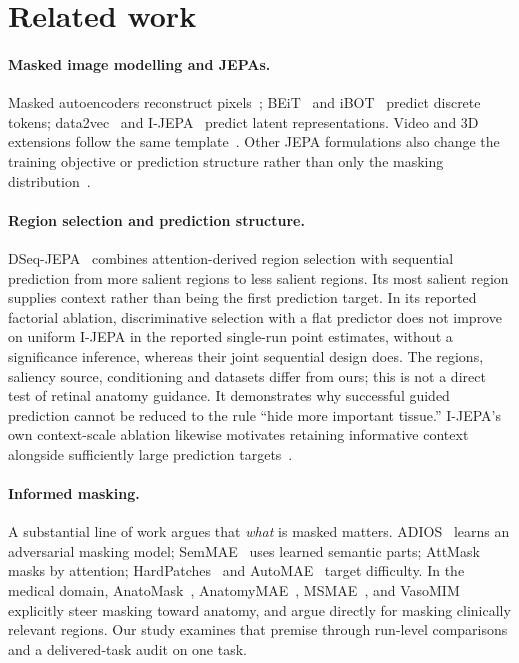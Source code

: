 \documentclass{article}
\begin{document}
\section{Related work}

\paragraph{Masked image modelling and JEPAs.}
Masked autoencoders reconstruct pixels~\citep{he2022mae,xie2022simmim};
BEiT~\citep{bao2022beit} and iBOT~\citep{zhou2022ibot} predict discrete tokens;
data2vec~\citep{baevski2022data2vec} and I-JEPA~\citep{assran2023ijepa} predict
latent representations. Video and 3D extensions follow the same
template~\citep{bardes2024vjepa,chen2023mim3d,taleb20203dssl}. Other JEPA
formulations also change the training objective or prediction structure
rather than only the masking distribution~\citep{balestriero2025lejepa,he2025dseqjepa}.

\paragraph{Region selection and prediction structure.}
DSeq-JEPA~\citep{he2025dseqjepa} combines attention-derived region selection
with sequential prediction from more salient regions to less salient regions.
Its most salient region supplies context rather than being the first prediction
target. In its reported factorial ablation, discriminative selection with a
flat predictor does not improve on uniform I-JEPA in the reported single-run
point estimates, without a significance inference,
whereas their joint sequential design does. The regions, saliency source,
conditioning and datasets differ from ours; this is not a direct test of
retinal anatomy guidance. It demonstrates why successful guided prediction
cannot be reduced to the rule ``hide more important tissue.'' I-JEPA's own
context-scale ablation likewise motivates retaining informative context
alongside sufficiently large prediction targets~\citep{assran2023ijepa}.

\paragraph{Informed masking.}
A substantial line of work argues that \emph{what} is masked matters.
ADIOS~\citep{shi2022adios} learns an adversarial masking model;
SemMAE~\citep{li2022semmae} uses learned semantic parts;
AttMask~\citep{kakogeorgiou2022attmask} masks by attention;
HardPatches~\citep{wang2023hpm} and AutoMAE~\citep{chen2023automae}
target difficulty. In the medical domain, AnatoMask~\citep{li2024anatomask},
AnatomyMAE~\citep{ceballosarroyo2026anatomymae},
MSMAE~\citep{mao2023msmae}, and VasoMIM~\citep{huang2026vasomim} explicitly
steer masking toward anatomy, and \citet{wang2025maskwhatmatters} argue directly
for masking clinically relevant regions. Our study examines that premise
through run-level comparisons and a delivered-task audit on one task.
\end{document}
